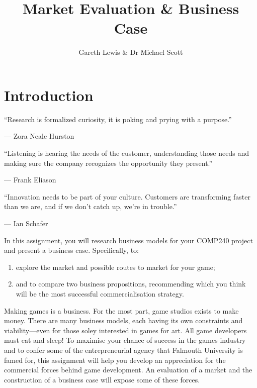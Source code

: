 \documentclass{../../fal_assignment}
\title{Market Evaluation \& Business Case}
\author{Gareth Lewis \& Dr Michael Scott}
\begin{document}
\maketitle

\section*{Introduction}

\begin{marginquote}
  ``Research is formalized curiosity, it is poking and prying with a purpose.''
  
   --- Zora Neale Hurston
   
    \marginquoterule
    
    ``Listening is hearing the needs of the customer, understanding those needs and making sure the company recognizes the opportunity they present.''
    
    --- Frank Eliason
    
    \marginquoterule
    
    ``Innovation needs to be part of your culture. Customers are transforming faster than we are, and if we don't catch up, we're in trouble.''
    
    --- Ian Schafer
      
\end{marginquote}

In this assignment, you will research business models for your COMP240 project and present a business case. Specifically, to: 

\begin{enumerate}[label=(\roman*)]
    \item explore the market and possible routes to market for your game;
    \item and to compare two business propositions, recommending which you think will be the most successful commercialisation strategy.
\end{enumerate}

Making games is a business. For the most part, game studios exists to make money. There are many business models, each having its own constraints and viability---even for those soley interested in games for art. All game developers must eat and sleep! To maximise your chance of success in the games industry and to confer some of the entrepreneurial agency that Falmouth University is famed for, this assignment will help you develop an appreciation for the commercial forces behind game development. An evaluation of a market and the construction of a business case will expose some of these forces.
\end{document}
